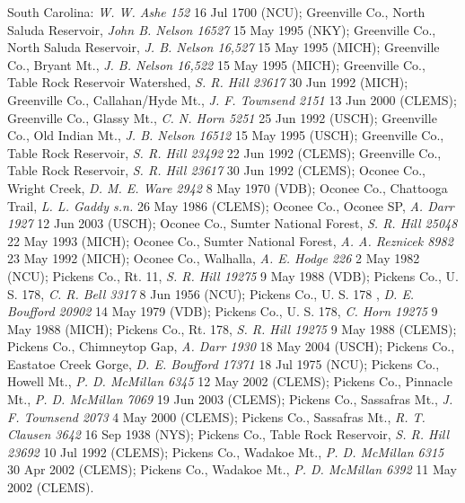 \documentclass{article}
\begin{document}
South Carolina:
\textit{W. W. Ashe 152} 16 Jul 1700 (NCU);
Greenville Co.,  North Saluda Reservoir, \textit{John B. Nelson 16527} 15 May 1995 (NKY);
Greenville Co., North Saluda Reservoir, \textit{J. B. Nelson 16,527} 15 May 1995 (MICH);
Greenville Co., Bryant Mt., \textit{J. B. Nelson 16,522} 15 May 1995 (MICH);
Greenville Co., Table Rock Reservoir Watershed, \textit{S. R. Hill 23617} 30 Jun 1992 (MICH);
Greenville Co., Callahan/Hyde Mt., \textit{J. F. Townsend 2151} 13 Jun 2000 (CLEMS);
Greenville Co., Glassy Mt., \textit{C. N. Horn 5251} 25 Jun 1992 (USCH);
Greenville Co., Old Indian Mt., \textit{J. B. Nelson 16512} 15 May 1995 (USCH);
Greenville Co., Table Rock Reservoir, \textit{S. R. Hill 23492} 22 Jun 1992 (CLEMS);
Greenville Co., Table Rock Reservoir, \textit{S. R. Hill 23617} 30 Jun 1992 (CLEMS);
Oconee Co., Wright Creek, \textit{D. M. E. Ware 2942} 8 May 1970 (VDB);
Oconee Co., Chattooga Trail, \textit{L. L. Gaddy s.n.} 26 May 1986 (CLEMS);
Oconee Co., Oconee SP, \textit{A. Darr 1927} 12 Jun 2003 (USCH);
Oconee Co., Sumter National Forest, \textit{S. R. Hill 25048} 22 May 1993 (MICH);
Oconee Co., Sumter National Forest, \textit{A. A. Reznicek 8982} 23 May 1992 (MICH);
Oconee Co., Walhalla, \textit{A. E. Hodge 226} 2 May 1982 (NCU);
Pickens Co., Rt. 11, \textit{S. R. Hill 19275} 9 May 1988 (VDB);
Pickens Co., U. S. 178, \textit{C. R. Bell 3317} 8 Jun 1956 (NCU);
Pickens Co., U. S. 178 , \textit{D. E. Boufford 20902} 14 May 1979 (VDB);
Pickens Co., U. S. 178, \textit{C. Horn 19275} 9 May 1988 (MICH);
Pickens Co., Rt. 178, \textit{S. R. Hill 19275} 9 May 1988 (CLEMS);
Pickens Co., Chimneytop Gap, \textit{A. Darr 1930} 18 May 2004 (USCH);
Pickens Co., Eastatoe Creek Gorge, \textit{D. E. Boufford 17371} 18 Jul 1975 (NCU);
Pickens Co., Howell Mt., \textit{P. D. McMillan 6345} 12 May 2002 (CLEMS);
Pickens Co., Pinnacle Mt., \textit{P. D. McMillan 7069} 19 Jun 2003 (CLEMS);
Pickens Co., Sassafras Mt., \textit{J. F. Townsend 2073} 4 May 2000 (CLEMS);
Pickens Co., Sassafras Mt., \textit{R. T. Clausen 3642} 16 Sep 1938 (NYS);
Pickens Co., Table Rock Reservoir, \textit{S. R. Hill 23692} 10 Jul 1992 (CLEMS);
Pickens Co., Wadakoe Mt., \textit{P. D. McMillan 6315} 30 Apr 2002 (CLEMS);
Pickens Co., Wadakoe Mt., \textit{P. D. McMillan 6392} 11 May 2002 (CLEMS).
\end{document}
